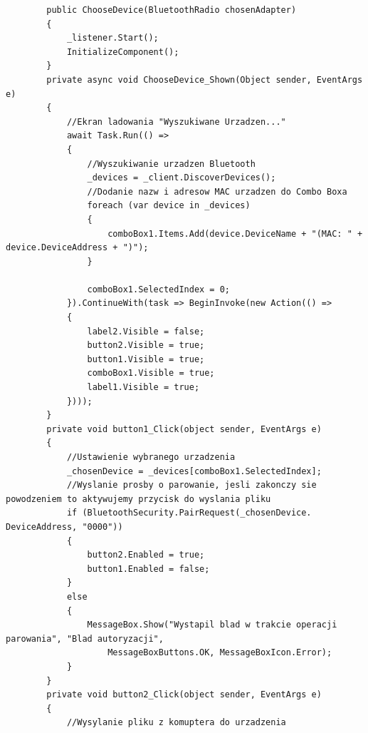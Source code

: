 \documentclass[12pt,a4paper,notitlepage]{report}
\begin{document}
\begin{adjustwidth}{0pt}{-50pt}
\begin{lstlisting}
        public ChooseDevice(BluetoothRadio chosenAdapter)
        {
            _listener.Start();
            InitializeComponent();
        }
        private async void ChooseDevice_Shown(Object sender, EventArgs e)
        {
            //Ekran ladowania "Wyszukiwane Urzadzen..."
            await Task.Run(() =>
            {
                //Wyszukiwanie urzadzen Bluetooth
                _devices = _client.DiscoverDevices();
                //Dodanie nazw i adresow MAC urzadzen do Combo Boxa
                foreach (var device in _devices)
                {
                    comboBox1.Items.Add(device.DeviceName + "(MAC: " + device.DeviceAddress + ")");
                }

                comboBox1.SelectedIndex = 0;
            }).ContinueWith(task => BeginInvoke(new Action(() =>
            {
                label2.Visible = false;
                button2.Visible = true;
                button1.Visible = true;
                comboBox1.Visible = true;
                label1.Visible = true;
            })));
        }
        private void button1_Click(object sender, EventArgs e)
        {
            //Ustawienie wybranego urzadzenia
            _chosenDevice = _devices[comboBox1.SelectedIndex];
            //Wyslanie prosby o parowanie, jesli zakonczy sie powodzeniem to aktywujemy przycisk do wyslania pliku
            if (BluetoothSecurity.PairRequest(_chosenDevice. DeviceAddress, "0000"))
            {
                button2.Enabled = true;
                button1.Enabled = false;
            }
            else
            {
                MessageBox.Show("Wystapil blad w trakcie operacji parowania", "Blad autoryzacji",
                    MessageBoxButtons.OK, MessageBoxIcon.Error);
            }
        }
        private void button2_Click(object sender, EventArgs e)
        {
            //Wysylanie pliku z komuptera do urzadzenia


\end{lstlisting}
\end{adjustwidth}
\end{document}
